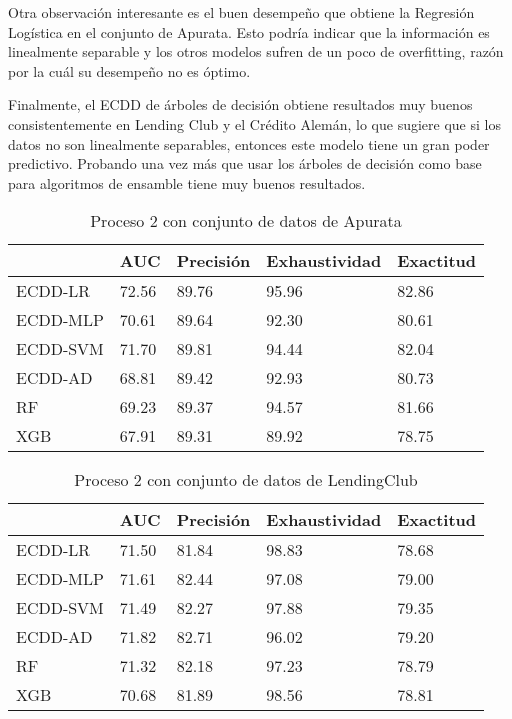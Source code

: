 Otra observación interesante es el buen desempeño que obtiene la Regresión Logística en el conjunto de Apurata. Esto podría indicar que la información es linealmente separable y los otros modelos sufren de un poco de overfitting, razón por la cuál su desempeño no es óptimo.

Finalmente, el \ac{ECDD} de árboles de decisión obtiene resultados muy buenos consistentemente en Lending Club y el Crédito Alemán, lo que sugiere que si los datos no son linealmente separables, entonces este modelo tiene un gran poder predictivo. Probando una vez más que usar los árboles de decisión como base para algoritmos de ensamble tiene muy buenos resultados.

\begin{table}[]
\centering
\caption{Proceso 2 con conjunto de datos de Apurata}
\label{tab:apurata-proc2}
\begin{tabularx}{0.75\textwidth}{|l|Y Y Y Y|}
				\hline
				& AUC	   & Precisión & Exhaustividad	& Exactitud  \\
				\hline
ECDD-LR			& 72.56	 & 89.76	 & 95.96	 & 82.86		\\
ECDD-MLP   		& 70.61	 & 89.64	 & 92.30	 & 80.61		\\
ECDD-SVM   		& 71.70	 & 89.81	 & 94.44	 & 82.04		\\
ECDD-AD			& 68.81	 & 89.42	 & 92.93	 & 80.73		\\
				\hline
RF	   		& 69.23	 & 89.37	 & 94.57	 & 81.66		\\
XGB	  		& 67.91	 & 89.31	 & 89.92	 & 78.75		\\
				\hline
\end{tabularx}
\end{table}


\begin{table}[]
\centering
\caption{Proceso 2 con conjunto de datos de LendingClub}
\label{tab:lc-proc2}
\begin{tabularx}{0.75\textwidth}{|l|Y Y Y Y|}
				\hline
				& AUC	   & Precisión & Exhaustividad	& Exactitud  \\
				\hline
ECDD-LR		   & 71.50	 & 81.84	 & 98.83	 & 78.68	 \\
ECDD-MLP		  & 71.61	 & 82.44	 & 97.08	 & 79.00	 \\
ECDD-SVM		  & 71.49	 & 82.27	 & 97.88	 & 79.35	 \\
ECDD-AD		   & 71.82	 & 82.71	 & 96.02	 & 79.20	 \\
				\hline
RF			  & 71.32	 & 82.18	 & 97.23	 & 78.79	 \\
XGB			 & 70.68	 & 81.89	 & 98.56	 & 78.81	 \\
				\hline
\end{tabularx}
\end{table}


